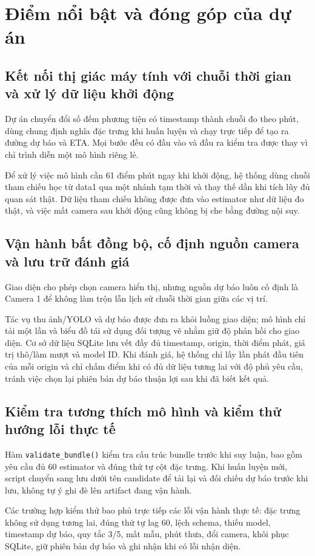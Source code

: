 \section{Điểm nổi bật và đóng góp của dự án}
    \subsection{Kết nối thị giác máy tính với chuỗi thời gian và xử lý dữ liệu khởi động}
Dự án chuyển đổi số đếm phương tiện có timestamp thành chuỗi đo theo phút, dùng chung định nghĩa đặc trưng khi huấn luyện và chạy trực tiếp để tạo ra đường dự báo và ETA. Mọi bước đều có đầu vào và đầu ra kiểm tra được thay vì chỉ trình diễn một mô hình riêng lẻ.

Để xử lý việc mô hình cần 61 điểm phút ngay khi khởi động, hệ thống dùng chuỗi tham chiếu học từ data1 qua một nhánh tạm thời và thay thế dần khi tích lũy đủ quan sát thật. Dữ liệu tham chiếu không được đưa vào estimator như dữ liệu đo thật, và việc mất camera sau khởi động cũng không bị che bằng đường nội suy.

\subsection{Vận hành bất đồng bộ, cố định nguồn camera và lưu trữ đánh giá}
Giao diện cho phép chọn camera hiển thị, nhưng nguồn dự báo luôn cố định là Camera 1 để không làm trộn lẫn lịch sử chuỗi thời gian giữa các vị trí.

Tác vụ thu ảnh/YOLO và dự báo được đưa ra khỏi luồng giao diện; mô hình chỉ tải một lần và biểu đồ tái sử dụng đối tượng vẽ nhằm giữ độ phản hồi cho giao diện. Cơ sở dữ liệu SQLite lưu vết đầy đủ timestamp, origin, thời điểm phát, giá trị thô/làm mượt và model ID. Khi đánh giá, hệ thống chỉ lấy lần phát đầu tiên của mỗi origin và chỉ chấm điểm khi có đủ dữ liệu tương lai với độ phủ yêu cầu, tránh việc chọn lại phiên bản dự báo thuận lợi sau khi đã biết kết quả.

\subsection{Kiểm tra tương thích mô hình và kiểm thử hướng lỗi thực tế}
Hàm \texttt{validate\_bundle()} kiểm tra cấu trúc bundle trước khi suy luận, bao gồm yêu cầu đủ 60 estimator và đúng thứ tự cột đặc trưng. Khi huấn luyện mới, script chuyển sang lưu dưới tên candidate để tải lại và đối chiếu dự báo trước khi lưu, không tự ý ghi đè lên artifact đang vận hành.

Các trường hợp kiểm thử bao phủ trực tiếp các lỗi vận hành thực tế: đặc trưng không sử dụng tương lai, đúng thứ tự lag 60, lệch schema, thiếu model, timestamp dự báo, quy tắc 3/5, mất mẫu, phút thưa, đổi camera, khôi phục SQLite, giữ phiên bản dự báo và ghi nhận khi có lỗi nhận diện.   